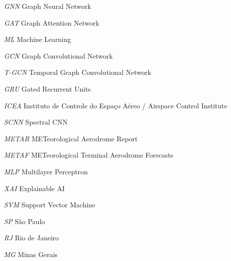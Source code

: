 \begin{siglas}
    \item[\textit{GNN}] Graph Neural Network
    \item[\textit{GAT}] Graph Attention Network
    \item[\textit{ML}] Machine Learning
    \item[\textit{GCN}] Graph Convolutional Network
    \item[\textit{T-GCN}] Temporal Graph Convolutional Network
    \item[\textit{GRU}] Gated Recurrent Units
    \item[\textit{ICEA}] Instituto de Controle do Espaço Aéreo / Airspace Control Institute
    \item[\textit{SCNN}] Spectral CNN
    \item [\textit{METAR}] METeorological Aerodrome Report
    \item [\textit{METAF}] METeorological Terminal Aerodrome Forecasts
    \item [\textit{MLP}] Multilayer Perceptron
    \item [\textit{XAI}] Explainable AI 
    \item [\textit{SVM}] Support Vector Machine
    \item [\textit{SP}] São Paulo
    \item [\textit{RJ}] Rio de Janeiro
    \item[\textit{MG}] Minas Gerais 
    
\end{siglas}

